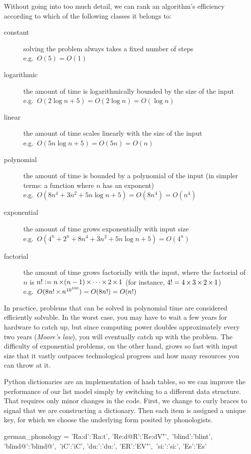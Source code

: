 \begin{techinfo}
    Without going into too much detail, we can rank an algorithm's efficiency according to which of the following classes it belongs to:
    \begin{description}
        \item[constant]
            solving the problem always takes a fixed number of steps\\
            e.g.\ $O(5) = O(1)$
        \item[logarithmic]
            the amount of time is logarithmically bounded by the size of the input\\
            e.g.\ $O(2 \log n + 5) = O(2 \log n) = O(\log n)$
        \item[linear]
            the amount of time scales linearly with the size of the input\\
            e.g.\ $O(5n \log n + 5) = O(5n) = O(n)$
        \item[polynomial]
            the amount of time is bounded by a polynomial of the input (in simpler terms: a function where $n$ has an exponent)\\
            e.g.\ $O(8n^4 + 3n^2 + 5n \log n + 5) = O(8n^4) = O(n^4)$
        \item[exponential]
            the amount of time grows exponentially with input size\\
            e.g.\ $O(4^n + 2^n + 8n^4 + 3n^2 + 5n \log n + 5) = O(4^n)$
        \item[factorial]
            the amount of time grows factorially with the input, where the factorial of $n$ is $n! \mathrel{\mathop:}= n \mathop{\times} (n - 1) \mathop{\times} \cdots \mathop{\times} 2 \mathop{\times} 1$ (for instance, $4! = 4 \mathop{\times} 3 \mathop{\times} 2 \mathop{\times} 1$)\\
            e.g.\ $O(8n! \mathop{\times} n^{10^{100}}) = O(8n!) = O(n!)$
    \end{description}
    In practice, problems that can be solved in polynomial time are considered efficiently solvable.
    In the worst case, you may have to wait a few years for hardware to catch up, but since computing power doubles approximately every two years (\emph{Moore's law}), you will eventually catch up with the problem.
    The difficulty of exponential problems, on the other hand, grows so fast with input size that it vastly outpaces technological progress and how many resources you can throw at it.
\end{techinfo}

Python dictionaries are an implementation of hash tables, so we can improve the performance of our list model simply by switching to a different data structure.
That requires only minor changes in the code.
First, we change to curly braces to signal that we are constructing a dictionary.
Then each item is assigned a unique key, for which we choose the underlying form posited by phonologists.
%
\begin{center}
    \begin{pythoncode}
        german_phonology = {'Ra:d':'Ra:t', 'Re:d@R':'Re:dV"',\
            'blind':'blint', 'blind@':'blind@',\
            'iC':'iC', 'du:':'du:', 'ER':'EV"',\
            'si:':'si:', 'Es':'Es'}
    \end{pythoncode}
\end{center}

